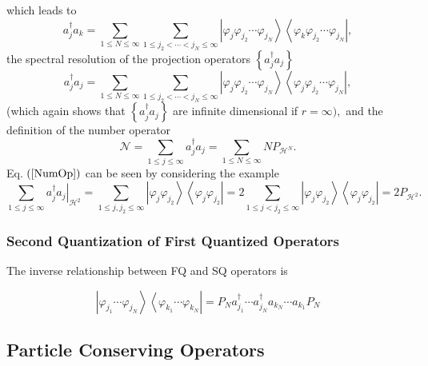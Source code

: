 \documentclass[aps,preprint]{revtex4}%
\begin{document}
which leads to
\begin{equation}
a_{j}^{\dagger}a_{k}=\sum_{1\leq N\leq\infty}\sum_{1\leq j_{2}<\cdots
<j_{N}\leq\infty}\left\vert \varphi_{j}\varphi_{j_{2}}\cdots\varphi_{j_{N}%
}\right\rangle \left\langle \varphi_{k}\varphi_{j_{2}}\cdots\varphi_{j_{N}%
}\right\vert ,
\end{equation}
the spectral resolution of the projection operators $\left\{  a_{j}^{\dagger
}a_{j}\right\}  $
\begin{equation}
a_{j}^{\dagger}a_{j}=\sum_{1\leq N\leq\infty}\sum_{1\leq j_{2}<\cdots
<j_{N}\leq\infty}\left\vert \varphi_{j}\varphi_{j_{2}}\cdots\varphi_{j_{N}%
}\right\rangle \left\langle \varphi_{j}\varphi_{j_{2}}\cdots\varphi_{j_{N}%
}\right\vert , \label{OccNumOp}%
\end{equation}
(which again shows that $\left\{  a_{j}^{\dagger}a_{j}\right\}  $ are infinite
dimensional if $r=\infty),$ and the definition of the number operator
\begin{equation}
\mathcal{N}=\sum_{1\leq j\leq\infty}a_{j}^{\dagger}a_{j}=\sum_{1\leq
N\leq\infty}NP_{\mathcal{H}^{N}}. \label{NumOp}%
\end{equation}
Eq. $\left(  \ref{NumOp}\right)  $ can be seen by considering the example%
\begin{equation}
\sum_{1\leq j\leq\infty}\left.  a_{j}^{\dagger}a_{j}\right\vert _{\mathcal{H}%
^{2}}=\sum_{1\leq j,j_{2}\leq\infty}\left\vert \varphi_{j}\varphi_{j_{2}%
}\right\rangle \left\langle \varphi_{j}\varphi_{j_{2}}\right\vert
=2\sum_{1\leq j<j_{2}\leq\infty}\left\vert \varphi_{j}\varphi_{j_{2}%
}\right\rangle \left\langle \varphi_{j}\varphi_{j_{2}}\right\vert
=2P_{\mathcal{H}^{2}}.
\end{equation}


\subsubsection{Second Quantization of First Quantized Operators}

The inverse relationship between FQ and SQ operators is%

\begin{equation}
\left\vert \varphi_{j_{1}}\cdots\varphi_{j_{N}}\right\rangle \left\langle
\varphi_{k_{1}}\cdots\varphi_{k_{N}}\right\vert =P_{N}a_{j_{1}}^{\dagger
}\cdots a_{j_{N}}^{\dagger}a_{k_{N}}\cdots a_{k_{1}}P_{N}%
\end{equation}


\subsection{Particle Conserving Operators}
\end{document}
